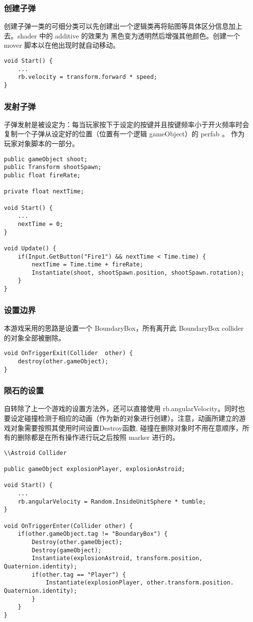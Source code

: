 \documentclass[10pt, a4paper]{article}
\begin{document}
        \subsubsection{创建子弹}
            创建子弹一类的可细分类可以先创建出一个逻辑类再将贴图等具体区分信息加上去。shader 中的 additive 的效果为 黑色变为透明然后增强其他颜色。创建一个 mover 脚本以在他出现时就自动移动。
\begin{lstlisting}
void Start() {
    ...
    rb.velocity = transform.forward * speed; 
}
\end{lstlisting}

        \subsubsection{发射子弹}
            子弹发射是被设定为：每当玩家按下于设定的按键并且按键频率小于开火频率时会复制一个子弹从设定好的位置（位置有一个逻辑 gameObject）的 perfab 。 作为玩家对象脚本的一部分。 
\begin{lstlisting}
public gameObject shoot; 
public Transform shootSpawn;
public float fireRate; 

private float nextTime; 

void Start() {
    ...
    nextTime = 0;
}

void Update() {
    if(Input.GetButton("Fire1") && nextTime < Time.time) {
        nextTime = Time.time + fireRate;
        Instantiate(shoot, shootSpawn.position, shootSpawn.rotation);
    }
}
\end{lstlisting}
        \subsubsection{设置边界}
            本游戏采用的思路是设置一个 BoundaryBox，所有离开此 BoundaryBox collider 的对象全部被删除。
\begin{lstlisting}
void OnTriggerExit(Collider  other) {
    destroy(other.gameObject);
}
\end{lstlisting}
        \subsubsection{陨石的设置}
            自转除了上一个游戏的设置方法外，还可以直接使用 rb.angularVelocity。同时也要设定碰撞检测于相应的动画（作为新的对象进行创建）。注意，动画所建立的游戏对象需要按照其使用时间设置Destroy函数, 碰撞在删除对象时不用在意顺序，所有的删除都是在所有操作进行玩之后按照 marker 进行的。
\begin{lstlisting}
\\Astroid Collider

public gameObject explosionPlayer, explosionAstroid;

void Start() {
    ...
    rb.angularVelocity = Random.InsideUnitSphere * tumble;
}

void OnTriggerEnter(Collider other) {
    if(other.gameObject.tag != "BoundaryBox") {
        Destroy(other.gameObject);
        Destroy(gameObject);
        Instantiate(explosionAstroid, transform.position, Quaternion.identity);
        if(other.tag == "Player") {
            Instantiate(explosionPlayer, other.transform.position. Quaternion.identity);
        }
    }
}
\end{lstlisting}
\end{document}

